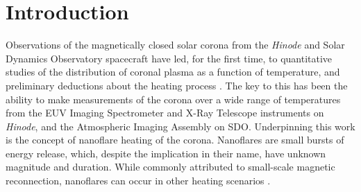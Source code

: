 \section{Introduction}\label{hot-plasma:sec:intro}

Observations of the magnetically closed solar corona from the \textit{Hinode} \citep{kosugi_hinode_2007} and Solar Dynamics Observatory \citep[SDO,][]{pesnell_solar_2012} spacecraft have led, for the first time, to quantitative studies of the distribution of coronal plasma as a function of temperature, and preliminary deductions about the heating process \citep[see papers in][]{de_moortel_recent_2015}. The key to this has been the ability to make measurements of the corona over a wide range of temperatures from the EUV Imaging Spectrometer \citep[EIS,][]{culhane_euv_2007} and X-Ray Telescope \citep[XRT,][]{golub_x-ray_2007} instruments on \textit{Hinode}, and the Atmospheric Imaging Assembly \citep[AIA,][]{lemen_atmospheric_2012} on SDO. Underpinning this work is the concept of nanoflare heating of the corona. Nanoflares \citep[e.g.][]{parker_nanoflares_1988} are small bursts of energy release, which, despite the implication in their name, have unknown magnitude and duration. While commonly attributed to small-scale magnetic reconnection, nanoflares can occur in other heating scenarios \citep[e.g.][]{ofman_self-consistent_1998}.

